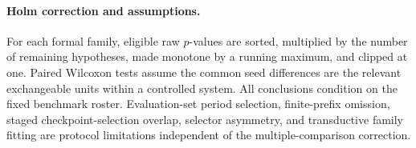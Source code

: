 \paragraph{Holm correction and assumptions.}
For each formal family, eligible raw \(p\)-values are sorted, multiplied by the number of remaining hypotheses, made monotone by a running maximum, and clipped at one. Paired Wilcoxon tests assume the common seed differences are the relevant exchangeable units within a controlled system. All conclusions condition on the fixed benchmark roster. Evaluation-set period selection, finite-prefix omission, staged checkpoint-selection overlap, selector asymmetry, and transductive family fitting are protocol limitations independent of the multiple-comparison correction.
